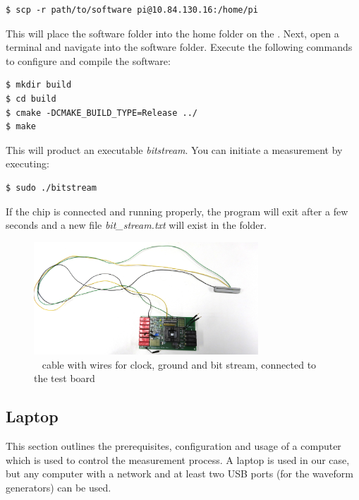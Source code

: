 \begin{verbatim}
$ scp -r path/to/software pi@10.84.130.16:/home/pi
\end{verbatim}

This will  place the software folder into the home folder on the \raspi. Next,
open a  terminal  and navigate into the software folder. Execute the following
commands to configure and compile the software:
\begin{verbatim}
$ mkdir build
$ cd build
$ cmake -DCMAKE_BUILD_TYPE=Release ../
$ make
\end{verbatim}

This  will  product an  executable  \textit{bitstream}.  You  can  initiate  a
measurement by executing:

\begin{verbatim}
$ sudo ./bitstream
\end{verbatim}

If the chip is  connected  and running properly, the program will exit after a
few seconds and  a new file \textit{bit\_stream.txt} will exist in the folder.

\begin{figure}
    \centering
    \includegraphics[width=0.75\textwidth]{images/expSetup/raspiCable.jpeg}
    \caption{%
        \raspi~ cable with  wires for clock, ground and  bit stream, connected
        to the test board%
    }
    \label{fig:raspiCable}
\end{figure}


\subsection{Laptop}
\label{subsec:laptop}

This section outlines the prerequisites, configuration and usage of a computer
which is  used to  control the  measurement process. A laptop  is used  in our
case, but  any computer with  a network  and at least  two USB ports  (for the
waveform generators) can be used.


